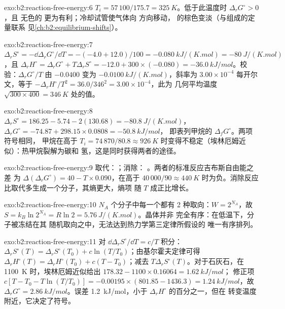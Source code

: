 \begin{solution}{exo:b2:reaction-free-energy:6}
$T_i = 57\,100/175.7 = \qty{325}{K}$。低于此温度时 $\Delta_r G^\circ > 0$，且
无色的  更为有利；冷却试管使气体向
 方向移动， 的棕色变淡（与组成的定量联系
见\cref{ch:b2:equilibrium-shifts}）。
\end{solution}

\begin{solution}{exo:b2:reaction-free-energy:7}
$\Delta_r S^\circ = -\dd\Delta_r G^\circ/\dd T = -(-4.0 + 12.0)/100 =
\qty{-0.080}{kJ/(K.mol)} = \qty{-80}{J/(K.mol)}$，且 $\Delta_r H^\circ =
\Delta_r G^\circ + T\Delta_r S^\circ = -12.0 + 300 \times (-0.080) =
\qty{-36.0}{kJ/mol}$。校验：$\Delta_r G^\circ/T$ 由 $-0.0400$ 变为
$\qty{-0.0100}{kJ/(K.mol)}$，斜率为 $3.00 \times 10^{-4}$ 每开尔文，等于
$-\Delta_r H^\circ/T^2 = 36.0/346^2 = 3.00 \times 10^{-4}$，此为
几何平均温度 $\sqrt{300 \times 400} = \qty{346}{K}$ 处的值。
\end{solution}

\begin{solution}{exo:b2:reaction-free-energy:8}
$\Delta_r S^\circ = 186.25 - 5.74 - 2(130.68) = \qty{-80.8}{J/(K.mol)}$，
$\Delta_r G^\circ = -74.87 + 298.15 \times 0.0808 = \qty{-50.8}{kJ/mol}$，
即表列甲烷的 $\Delta_f G^\circ$。两项符号相同，
甲烷在高于 $T_i = 74\,870/80.8 \approx
\qty{926}{K}$ 时变得不稳定（埃林厄姆近似）：热甲烷裂解为碳和
氢，这是同时获得两者的途径。
\end{solution}

\begin{solution}{exo:b2:reaction-free-energy:9}
取代：；消除：
。两者的标准反应吉布斯自由能之差
为 $\Delta(\Delta_r G^\circ) = 40 - T \times
0.090$，在高于 $40\,000/90 \approx \qty{440}{K}$ 时为负。消除反应
比取代多生成一个分子，其熵更大，熵项
随 $T$ 成正比增长。
\end{solution}

\begin{solution}{exo:b2:reaction-free-energy:10}
$N_A$ 个分子中每一个都有 2 种取向：$W = 2^{N_A}$，故 $S =
k_B\ln 2^{N_A} = R\ln 2 = \qty{5.76}{J/(K.mol)}$。晶体并非
完全有序：在低温下，分子被冻结在其
随机取向之中，无法达到热力学第三定律所假设的
唯一有序排列。
\end{solution}

\begin{solution}{exo:b2:reaction-free-energy:11}
对 $\dd\Delta_r S^\circ/\dd T = c/T$ 积分：$\Delta_r S^\circ(T) = \Delta_r
S^\circ(T_0) + c\ln(T/T_0)$；由基尔霍夫定律可得 $\Delta_r H^\circ(T) = \Delta_r
H^\circ(T_0) + c(T - T_0)$；减去 $T\Delta_r S^\circ(T)$。对于石灰石，在
\qty{1100}{K} 时，埃林厄姆近似给出 $178.32 - 1100 \times 0.16064 = \qty{1.62}{kJ/mol}$；
修正项 $c[T - T_0 - T\ln(T/T_0)] = -0.00195 \times (801.85 - 1436.3) =
\qty{+1.24}{kJ/mol}$，故 $\Delta_r G^\circ = \qty{2.86}{kJ/mol}$。误差
\qty{1.2}{kJ/mol}，小于 $\Delta_r H^\circ$ 的百分之一，但在
转变温度附近，它决定了符号。
\end{solution}

